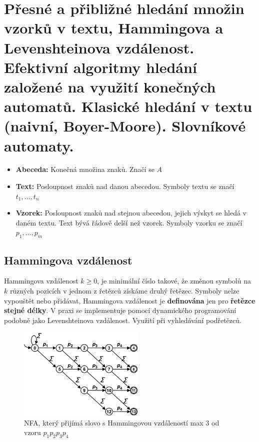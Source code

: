 \section[PAL - Vyhledávání v textu, automaty]{Přesné a přibližné hledání množin vzorků v textu, Hammingova a Levenshteinova vzdálenost. Efektivní algoritmy hledání založené na využití konečných automatů. Klasické hledání v textu (naivní, Boyer-Moore). Slovníkové automaty.}

\begin{itemize}
\item \textbf{Abeceda:} Konečná množina znaků. Značí se $A$
\item \textbf{Text:} Posloupnost znaků nad danou abecedou. Symboly textu se značí $t_1, \hdots, t_n$
\item \textbf{Vzorek:} Posloupnost znaků nad stejnou abecedou, jejich výskyt se hledá v daném textu. Text bývá řádově delší než vzorek. Symboly vzorku se značí $p_1, \hdots, p_m$
\end{itemize}

\subsection{Hammingova vzdálenost}
Hammingova vzdálenost $k \geq 0$, je minimální číslo takové, že změnou symbolů na $k$ různých pozicích v jednom z řetězců získáme druhý řetězec. Symboly nelze vypouštět nebo přidávat, Hammingova vzdálenost je \textbf{definována} jen pro \textbf{řetězce stejné délky}. V praxi se implementuje pomocí dynamického programování podobně jako Levenshteinova vzdálenost. Využití při vyhledávání podřetězců.

\begin{figure}[h]
    \begin{center}
        \includegraphics[width=60mm]{04/images/hamming-automat}
    \end{center}
    \caption{NFA, který přijímá slovo s Hammingovou vzdáleností max 3 od vzoru $p_1p_2p_3p_4$}
\end{figure}

